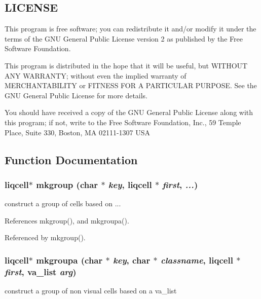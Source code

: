 \subsection{LICENSE}\label{d7/db4/liqcell__prop_8c_LICENSE}
This program is free software; you can redistribute it and/or modify it under the terms of the GNU General Public License version 2 as published by the Free Software Foundation.

This program is distributed in the hope that it will be useful, but WITHOUT ANY WARRANTY; without even the implied warranty of MERCHANTABILITY or FITNESS FOR A PARTICULAR PURPOSE. See the GNU General Public License for more details.

You should have received a copy of the GNU General Public License along with this program; if not, write to the Free Software Foundation, Inc., 59 Temple Place, Suite 330, Boston, MA 02111-1307 USA 

\subsection{Function Documentation}
\subsubsection[{mkgroup}]{\setlength{\rightskip}{0pt plus 5cm}liqcell$\ast$ mkgroup (char $\ast$ {\em key}, \/  liqcell $\ast$ {\em first}, \/   {\em ...})}\label{df/dca/liqcell__mk__star_8h_8f8accc4fe47de9f5fa78df46f4d97a9}


construct a group of cells based on ... 

References mkgroup(), and mkgroupa().

Referenced by mkgroup().
\subsubsection[{mkgroupa}]{\setlength{\rightskip}{0pt plus 5cm}liqcell$\ast$ mkgroupa (char $\ast$ {\em key}, \/  char $\ast$ {\em classname}, \/  liqcell $\ast$ {\em first}, \/  va\_\-list {\em arg})}\label{df/dca/liqcell__mk__star_8h_608587c6ea778a212270715cf6b81b75}


construct a group of non visual cells based on a va\_\-list 

